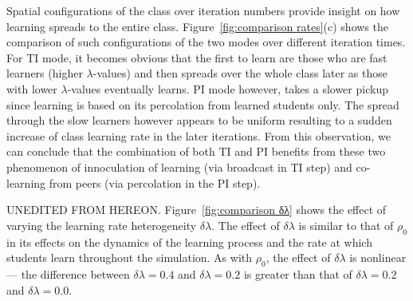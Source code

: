\documentclass[twocolumn,secnumarabic,amssymb, nobibnotes, aps, prd]{revtex4-2}
\begin{document}
        Spatial configurations of the class over iteration numbers provide insight on how learning spreads to the entire class.
        Figure~\ref{fig:comparison rates}(c) shows the comparison of such configurations of the two modes over different iteration times.
        For TI mode, it becomes obvious that the first to learn are those who are fast learners (higher $\lambda$-values) and then spreads over the whole class later as those with lower $\lambda$-values eventually learns.
        PI mode however, takes a slower pickup since learning is based on its percolation from learned students only.
        The spread through the slow learners however appears to be uniform resulting to a sudden increase of class learning rate in the later iterations.
        From this observation, we can conclude that the combination of both TI and PI benefits from these two phenomenon of innoculation of learning (via broadcast in TI step) and co-learning from peers (via percolation in the PI step).

        {\color{red} UNEDITED FROM HEREON.}
        Figure~\ref{fig:comparison δλ} shows the effect of varying the learning rate heterogeneity $\delta\lambda$.
        The effect of $\delta\lambda$ is similar to that of $\rho_0$ in its effects on the dynamics of the learning process and the rate at which students learn throughout the simulation.
        As with $\rho_0$, the effect of $\delta\lambda$ is nonlinear --- the difference between $\delta\lambda=0.4$ and $\delta\lambda=0.2$ is greater than that of $\delta\lambda=0.2$ and $\delta\lambda=0.0$.


        
        
\end{document}

